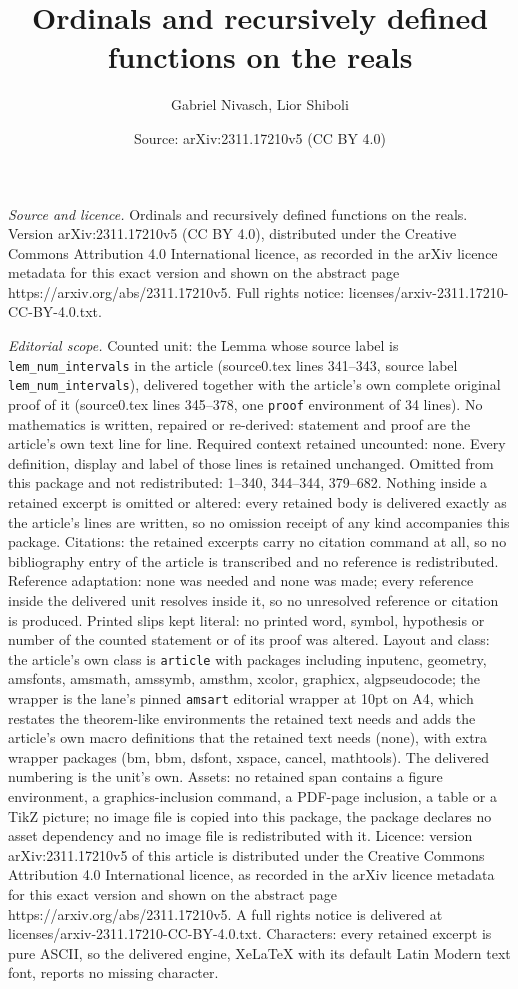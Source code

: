 \documentclass[10pt,a4paper]{amsart}
\title[Ordinals and recursively defined functions on the reals]{Ordinals and recursively defined functions on the reals}
\author{Gabriel Nivasch, Lior Shiboli}
\date{Source: arXiv:2311.17210v5 (CC BY 4.0)}
\begin{document}
\maketitle

\noindent\emph{Source and licence.} Ordinals and recursively defined functions on the reals. Version arXiv:2311.17210v5 (CC BY 4.0), distributed under the Creative Commons Attribution 4.0 International licence, as recorded in the arXiv licence metadata for this exact version and shown on the abstract page https://arxiv.org/abs/2311.17210v5. Full rights notice: licenses/arxiv-2311.17210-CC-BY-4.0.txt.\par\smallskip

\noindent\textit{Editorial scope.} Counted unit: the Lemma whose source label is \texttt{lem\_num\_intervals} in the article (source0.tex lines 341--343, source label \texttt{lem\_num\_intervals}), delivered together with the article's own complete original proof of it (source0.tex lines 345--378, one \texttt{proof} environment of 34 lines). No mathematics is written, repaired or re-derived: statement and proof are the article's own text line for line. Required context retained uncounted: none. Every definition, display and label of those lines is retained unchanged. Omitted from this package and not redistributed: 1--340, 344--344, 379--682. Nothing inside a retained excerpt is omitted or altered: every retained body is delivered exactly as the article's lines are written, so no omission receipt of any kind accompanies this package. Citations: the retained excerpts carry no citation command at all, so no bibliography entry of the article is transcribed and no reference is redistributed. Reference adaptation: none was needed and none was made; every reference inside the delivered unit resolves inside it, so no unresolved reference or citation is produced. Printed slips kept literal: no printed word, symbol, hypothesis or number of the counted statement or of its proof was altered. Layout and class: the article's own class is \texttt{article} with packages including inputenc, geometry, amsfonts, amsmath, amssymb, amsthm, xcolor, graphicx, algpseudocode; the wrapper is the lane's pinned \texttt{amsart} editorial wrapper at 10pt on A4, which restates the theorem-like environments the retained text needs and adds the article's own macro definitions that the retained text needs (none), with extra wrapper packages (bm, bbm, dsfont, xspace, cancel, mathtools). The delivered numbering is the unit's own. Assets: no retained span contains a figure environment, a graphics-inclusion command, a PDF-page inclusion, a table or a TikZ picture; no image file is copied into this package, the package declares no asset dependency and no image file is redistributed with it. Licence: version arXiv:2311.17210v5 of this article is distributed under the Creative Commons Attribution 4.0 International licence, as recorded in the arXiv licence metadata for this exact version and shown on the abstract page https://arxiv.org/abs/2311.17210v5. A full rights notice is delivered at licenses/arxiv-2311.17210-CC-BY-4.0.txt. Characters: every retained excerpt is pure ASCII, so the delivered engine, XeLaTeX with its default Latin Modern text font, reports no missing character.
\end{document}
